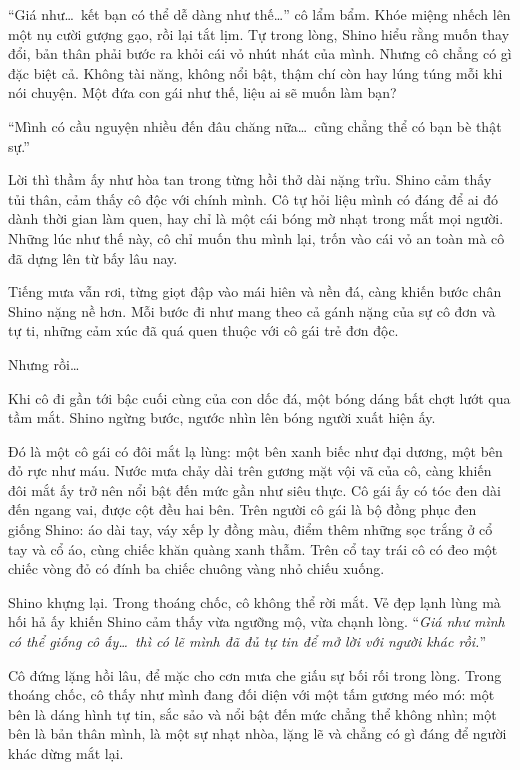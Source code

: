 \documentclass[../main.tex]{subfiles}
\begin{document}
``Giá như\dots\ kết bạn có thể dễ dàng như thế\dots'' cô lẩm bẩm. Khóe miệng nhếch lên một nụ cười gượng gạo, rồi lại tắt lịm. Tự trong lòng, Shino hiểu rằng muốn thay đổi, bản thân phải bước ra khỏi cái vỏ nhút nhát của mình. Nhưng cô chẳng có gì đặc biệt cả. Không tài năng, không nổi bật, thậm chí còn hay lúng túng mỗi khi nói chuyện. Một đứa con gái như thế, liệu ai sẽ muốn làm bạn?

``Mình có cầu nguyện nhiều đến đâu chăng nữa\dots\ cũng chẳng thể có bạn bè thật sự.''

Lời thì thầm ấy như hòa tan trong từng hồi thở dài nặng trĩu. Shino cảm thấy tủi thân, cảm thấy cô độc với chính mình. Cô tự hỏi liệu mình có đáng để ai đó dành thời gian làm quen, hay chỉ là một cái bóng mờ nhạt trong mắt mọi người. Những lúc như thế này, cô chỉ muốn thu mình lại, trốn vào cái vỏ an toàn mà cô đã dựng lên từ bấy lâu nay.


Tiếng mưa vẫn rơi, từng giọt đập vào mái hiên và nền đá, càng khiến bước chân Shino nặng nề hơn. Mỗi bước đi như mang theo cả gánh nặng của sự cô đơn và tự ti, những cảm xúc đã quá quen thuộc với cô gái trẻ đơn độc.

Nhưng rồi\dots

Khi cô đi gần tới bậc cuối cùng của con dốc đá, một bóng dáng bất chợt lướt qua tầm mắt. Shino ngừng bước, ngước nhìn lên bóng người xuất hiện ấy.

Đó là một cô gái có đôi mắt lạ lùng: một bên xanh biếc như đại dương, một bên đỏ rực như máu. Nước mưa chảy dài trên gương mặt vội vã của cô, càng khiến đôi mắt ấy trở nên nổi bật đến mức gần như siêu thực. Cô gái ấy có tóc đen dài đến ngang vai, được cột đều hai bên. Trên người cô gái là bộ đồng phục đen giống Shino: áo dài tay, váy xếp ly đồng màu, điểm thêm những sọc trắng ở cổ tay và cổ áo, cùng chiếc khăn quàng xanh thẫm. Trên cổ tay trái cô có đeo một chiếc vòng đỏ có đính ba chiếc chuông vàng nhỏ chiếu xuống.


Shino khựng lại. Trong thoáng chốc, cô không thể rời mắt. Vẻ đẹp lạnh lùng mà hối hả ấy khiến Shino cảm thấy vừa ngưỡng mộ, vừa chạnh lòng. ``\textit{Giá như mình có thể giống cô ấy\dots\ thì có lẽ mình đã đủ tự tin để mở lời với người khác rồi.}''

Cô đứng lặng hồi lâu, để mặc cho cơn mưa che giấu sự bối rối trong lòng. Trong thoáng chốc, cô thấy như mình đang đối diện với một tấm gương méo mó: một bên là dáng hình tự tin, sắc sảo và nổi bật đến mức chẳng thể không nhìn; một bên là bản thân mình, là một sự nhạt nhòa, lặng lẽ và chẳng có gì đáng để người khác dừng mắt lại.
\end{document}
